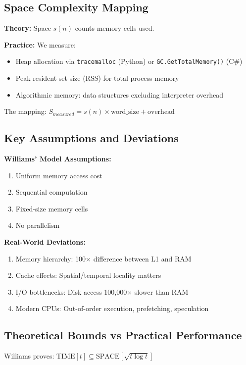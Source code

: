 \documentclass[11pt]{article}
\theoremstyle{definition}
\begin{document}
\subsection{Space Complexity Mapping}

\textbf{Theory:} Space $s(n)$ counts memory cells used.

\textbf{Practice:} We measure:
\begin{itemize}
\item Heap allocation via \texttt{tracemalloc} (Python) or \texttt{GC.GetTotalMemory()} (C\#)
\item Peak resident set size (RSS) for total process memory
\item Algorithmic memory: data structures excluding interpreter overhead
\end{itemize}

The mapping: $S_{measured} = s(n) \times \text{word\_size} + \text{overhead}$

\subsection{Key Assumptions and Deviations}

\textbf{Williams' Model Assumptions:}
\begin{enumerate}
\item Uniform memory access cost
\item Sequential computation
\item Fixed-size memory cells
\item No parallelism
\end{enumerate}

\textbf{Real-World Deviations:}
\begin{enumerate}
\item Memory hierarchy: 100$\times$ difference between L1 and RAM
\item Cache effects: Spatial/temporal locality matters
\item I/O bottlenecks: Disk access 100,000$\times$ slower than RAM
\item Modern CPUs: Out-of-order execution, prefetching, speculation
\end{enumerate}

\subsection{Theoretical Bounds vs Practical Performance}

Williams proves: $\text{TIME}[t] \subseteq \text{SPACE}[\sqrt{t \log t}]$
\end{document}
